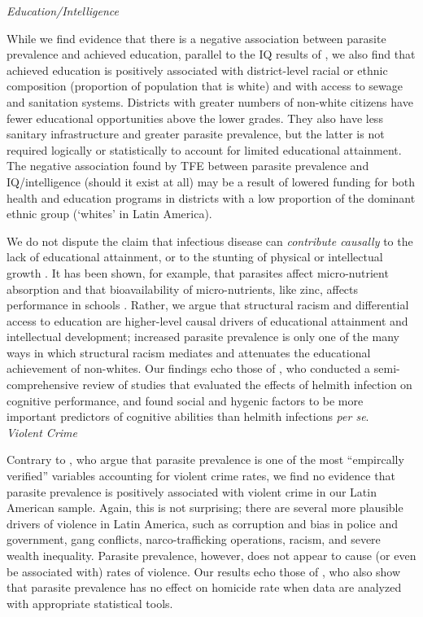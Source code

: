 \documentclass[12pt]{article}
\begin{document}
\noindent\textit{Education/Intelligence}

	While we find evidence that there is a negative association between parasite prevalence and achieved education, parallel to the IQ results of \citet{Eppig2010}, we also find that achieved education is positively associated with district-level racial or ethnic composition (proportion of population that is white) and with access to sewage and sanitation systems.  Districts with greater numbers of non-white citizens have fewer educational opportunities above the lower grades.  They also have less sanitary infrastructure and greater parasite prevalence, but the latter is not required logically or statistically to account for limited educational attainment.  The negative association found by TFE between parasite prevalence and IQ/intelligence (should it exist at all) may be a result of lowered funding for both health and education programs in districts with a low proportion of the dominant ethnic group (`whites' in Latin America).


	We do not dispute the claim that infectious disease can \textit{contribute causally} to the lack of educational attainment, or to the stunting of physical \citep{stephenson1989treatment} or intellectual growth \citep{oknes1994does}.  It has been shown, for example, that parasites affect micro-nutrient absorption and that bioavailability of micro-nutrients, like zinc, affects performance in schools \citep{demment2003providing, neumann2003animal}. Rather, we argue that structural racism and differential access to education are higher-level causal drivers of educational attainment and intellectual development; increased parasite prevalence is only one of the many ways in which structural racism mediates and attenuates the educational achievement of non-whites.  Our findings echo those of \citet{oknes1994does}, who conducted a semi-comprehensive review of studies that evaluated the effects of helmith infection on cognitive performance, and found social and hygenic factors to be more important predictors of cognitive abilities than helmith infections \textit{per se}.\\

\noindent\textit{Violent Crime}

		Contrary to \citet{Thornhill2011}, who argue that parasite prevalence is one of the most ``empircally verified'' variables accounting for violent crime rates, we find no evidence that parasite prevalence is positively associated with violent crime in our Latin American sample. Again, this is not surprising; there are several more plausible drivers of violence in Latin America, such as corruption and bias in police and government, gang conflicts, narco-trafficking operations, racism, and severe wealth inequality.  Parasite prevalence, however, does not appear to cause (or even be associated with) rates of violence. Our results echo those of \citet{hackman2013fast}, who also show that parasite prevalence has no effect on homicide rate when data are analyzed with appropriate statistical tools.   \\
	
\end{document}
